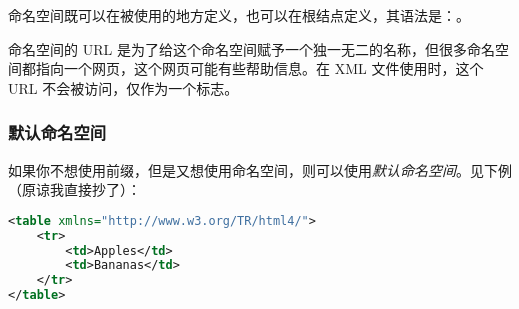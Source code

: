 命名空间既可以在被使用的地方定义，也可以在根结点定义，其语法是：。

命名空间的 URL 是为了给这个命名空间赋予一个独一无二的名称，但很多命名空间都指向一个网页，这个网页可能有些帮助信息。在 XML 文件使用时，这个 URL 不会被访问，仅作为一个标志。

\subsubsection{默认命名空间}

如果你不想使用前缀，但是又想使用命名空间，则可以使用\emph{默认命名空间}。见下例（原谅我直接抄了）：
\begin{lstlisting}[language = xml]
<table xmlns="http://www.w3.org/TR/html4/">
    <tr>
        <td>Apples</td>
        <td>Bananas</td>
    </tr>
</table>
\end{lstlisting}